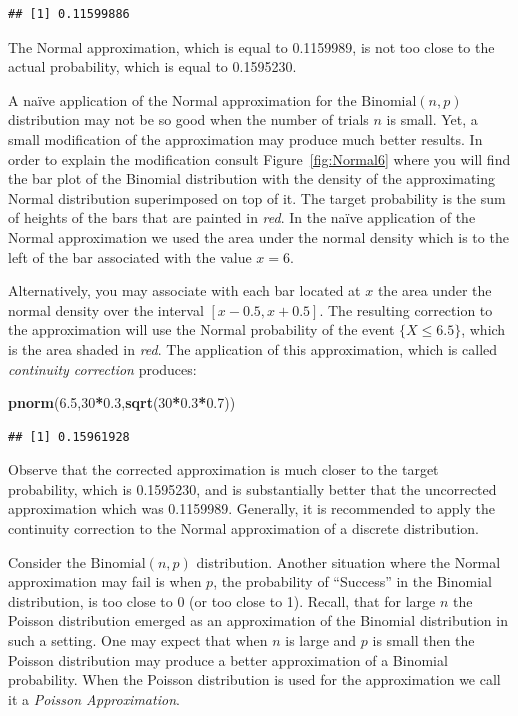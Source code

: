 \documentclass[]{krantz}
\makeatletter
\newenvironment{Shaded}{\begin{snugshade}}{\end{snugshade}}
\newcommand{\DecValTok}[1]{\textcolor[rgb]{0.00,0.00,0.81}{#1}}
\newcommand{\FloatTok}[1]{\textcolor[rgb]{0.00,0.00,0.81}{#1}}
\newcommand{\KeywordTok}[1]{\textcolor[rgb]{0.13,0.29,0.53}{\textbf{#1}}}
\newcommand{\NormalTok}[1]{#1}
\newcommand{\OperatorTok}[1]{\textcolor[rgb]{0.81,0.36,0.00}{\textbf{#1}}}
\newenvironment{kframe}{%
\medskip{}
\setlength{\fboxsep}{.8em}
 \def\at@end@of@kframe{}%
 \ifinner\ifhmode%
  \def\at@end@of@kframe{\end{minipage}}%
  \begin{minipage}{\columnwidth}%
 \fi\fi%
 \def\FrameCommand##1{\hskip\@totalleftmargin \hskip-\fboxsep
 \colorbox{shadecolor}{##1}\hskip-\fboxsep
     \hskip-\linewidth \hskip-\@totalleftmargin \hskip\columnwidth}%
 \MakeFramed {\advance\hsize-\width
   \@totalleftmargin\z@ \linewidth\hsize
   \@setminipage}}%
 {\par\unskip\endMakeFramed%
 \at@end@of@kframe}
\renewenvironment{Shaded}{\begin{kframe}}{\end{kframe}}
\theoremstyle{definition}
\theoremstyle{definition}
\theoremstyle{definition}
\theoremstyle{remark}
\makeatother
\begin{document}
\begin{verbatim}
## [1] 0.11599886
\end{verbatim}

The Normal approximation, which is equal to 0.1159989, is not too close
to the actual probability, which is equal to 0.1595230.

A naïve application of the Normal approximation for the
\(\mathrm{Binomial}(n,p)\) distribution may not be so good when the number
of trials \(n\) is small. Yet, a small modification of the approximation
may produce much better results. In order to explain the modification
consult Figure~\ref{fig:Normal6} where you will find the bar plot of the
Binomial distribution with the density of the approximating Normal
distribution superimposed on top of it. The target probability is the
sum of heights of the bars that are painted in \emph{red}. In the naïve
application of the Normal approximation we used the area under the
normal density which is to the left of the bar associated with the value
\(x=6\).

Alternatively, you may associate with each bar located at \(x\) the area
under the normal density over the interval \([x-0.5, x+0.5]\). The
resulting correction to the approximation will use the Normal
probability of the event \(\{X \leq 6.5\}\), which is the area shaded in
\emph{red}. The application of this approximation, which is called
\emph{continuity correction} produces:

\begin{Shaded}
\begin{Highlighting}[]
\KeywordTok{pnorm}\NormalTok{(}\FloatTok{6.5}\NormalTok{,}\DecValTok{30}\OperatorTok{*}\FloatTok{0.3}\NormalTok{,}\KeywordTok{sqrt}\NormalTok{(}\DecValTok{30}\OperatorTok{*}\FloatTok{0.3}\OperatorTok{*}\FloatTok{0.7}\NormalTok{))}
\end{Highlighting}
\end{Shaded}

\begin{verbatim}
## [1] 0.15961928
\end{verbatim}

Observe that the corrected approximation is much closer to the target
probability, which is 0.1595230, and is substantially better that the
uncorrected approximation which was 0.1159989. Generally, it is
recommended to apply the continuity correction to the Normal
approximation of a discrete distribution.

Consider the \(\mathrm{Binomial}(n,p)\) distribution. Another situation
where the Normal approximation may fail is when \(p\), the probability of
``Success'' in the Binomial distribution, is too close to 0 (or too close
to 1). Recall, that for large \(n\) the Poisson distribution emerged as an
approximation of the Binomial distribution in such a setting. One may
expect that when \(n\) is large and \(p\) is small then the Poisson
distribution may produce a better approximation of a Binomial
probability. When the Poisson distribution is used for the approximation
we call it a \emph{Poisson Approximation}.
\end{document}
